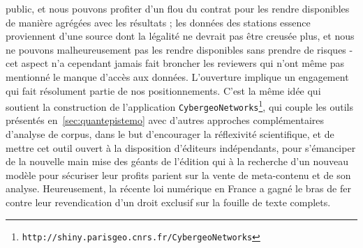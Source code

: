 public, et nous pouvons profiter d'un flou du contrat pour les rendre disponibles de manière agrégées avec les résultats ; les données des stations essence proviennent d'une source dont la légalité ne devrait pas être creusée plus, et nous ne pouvons malheureusement pas les rendre disponibles sans prendre de risques - cet aspect n'a cependant jamais fait broncher les reviewers qui n'ont même pas mentionné le manque d'accès aux données. L'ouverture implique un engagement qui fait résolument partie de nos positionnements. C'est la même idée qui soutient la construction de l'application \texttt{CybergeoNetworks}\footnote{\texttt{http://shiny.parisgeo.cnrs.fr/CybergeoNetworks}}, qui couple les outils présentés en~\ref{sec:quantepistemo} avec d'autres approches complémentaires d'analyse de corpus, dans le but d'encourager la réflexivité scientifique, et de mettre cet outil ouvert à la disposition d'éditeurs indépendants, pour s'émanciper de la nouvelle main mise des géants de l'édition qui à la recherche d'un nouveau modèle pour sécuriser leur profits parient sur la vente de meta-contenu et de son analyse. Heureusement, la récente loi numérique en France a gagné le bras de fer contre leur revendication d'un droit exclusif sur la fouille de texte complets.







